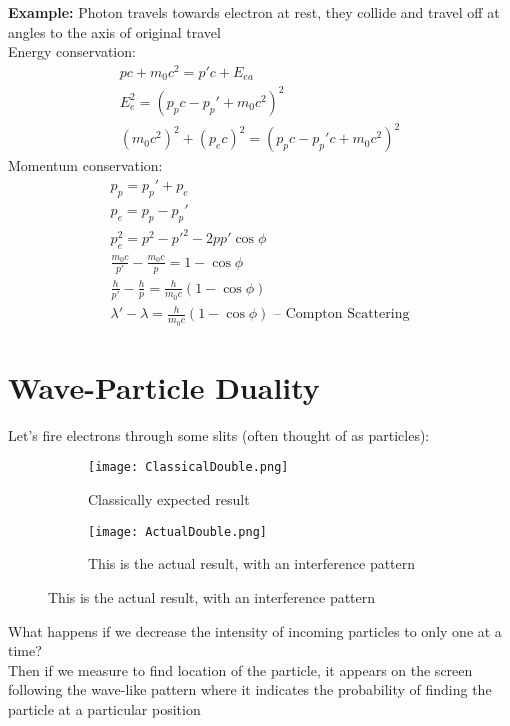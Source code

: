 \documentclass[a4paper, 11pt, fleqn, normalem]{report}
\begin{document}
\textbf{Example: }Photon travels towards electron at rest, they collide and travel off at angles to the axis of original travel \\
Energy conservation:
\begin{gather*}
    pc + m_{0}c^{2} = p'c + E_{ea} \\
    E_{e}^{2} = (p_{p}c - p_{p}' + m_{0}c^{2})^{2} \\
    (m_{0}c^{2})^{2} + (p_{e}c)^{2} = (p_{p}c - p_{p}'c + m_{0}c^{2})^{2}
\end{gather*}
Momentum conservation:
\begin{gather*}
    p_{p} = p_{p}' + p_{e} \\
    p_{e} = p_{p} - p_{p}' \\
    p_{e}^{2} = p^{2} - p'^{2} - 2pp'\cos{\phi} \\
    \frac{m_{0}c}{p'} - \frac{m_{0}c}{p} = 1 - \cos{\phi} \\
    \frac{h}{p'} - \frac{h}{p} = \frac{h}{m_{0}c}(1 - \cos{\phi}) \\
    \lambda' - \lambda = \frac{h}{m_{0}c}(1 - \cos{\phi})\text{ -- Compton Scattering}
\end{gather*}

\section{Wave-Particle Duality}
Let's fire electrons through some slits (often thought of as particles):
\begin{figure}[H]
    \begin{subfigure}{0.6\textwidth}
        \caption{Classically expected result}
        \texttt{[image: ClassicalDouble.png]}
    \end{subfigure}

    \begin{subfigure}{0.8\textwidth}
        \caption{This is the actual result, with an interference pattern}
        \texttt{[image: ActualDouble.png]}
    \end{subfigure}
\end{figure}
What happens if we decrease the intensity of incoming particles to only one at a time? \\
Then if we measure to find location of the particle, it appears on the screen following the wave-like pattern where it indicates the probability of finding the particle at a particular position
\end{document}
